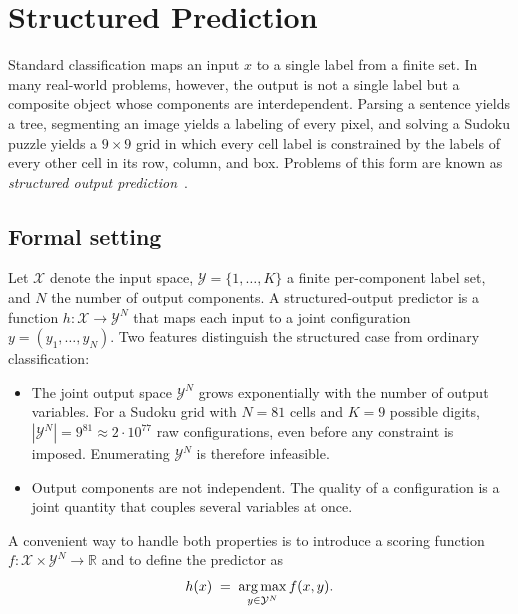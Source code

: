 \bigskip

\section{Structured Prediction}
\label{sec:structured-prediction}

Standard classification maps an input $x$ to a single label from a
finite set. In many real-world problems, however, the output is not a
single label but a composite object whose components are interdependent.
Parsing a sentence yields a tree, segmenting an image yields a labeling
of every pixel, and solving a Sudoku puzzle yields a $9 \times 9$ grid
in which every cell label is constrained by the labels of every other
cell in its row, column, and box. Problems of this form are known as
\emph{structured output prediction}~\cite{Bakir2007}.

\subsection{Formal setting}

Let $\mathcal{X}$ denote the input space, $\mathcal{Y} = \{1, \ldots,
K\}$ a finite per-component label set, and $N$ the number of output
components. A structured-output predictor is a function
$h\colon \mathcal{X} \to \mathcal{Y}^{N}$ that maps each input to a
joint configuration $y = (y_1, \ldots, y_N)$. Two features
distinguish the structured case from ordinary classification:
\begin{itemize}
    \item The joint output space $\mathcal{Y}^{N}$ grows exponentially
    with the number of output variables. For a Sudoku grid with
    $N = 81$ cells and $K = 9$ possible digits,
    $|\mathcal{Y}^{N}| = 9^{81} \approx 2 \cdot 10^{77}$ raw
    configurations, even before any constraint is imposed. Enumerating
    $\mathcal{Y}^{N}$ is therefore infeasible.
    \item Output components are not independent. The quality of a
    configuration is a joint quantity that couples several variables at
    once.
\end{itemize}

A convenient way to handle both properties is to introduce a scoring
function $f\colon \mathcal{X} \times \mathcal{Y}^{N} \to \mathbb{R}$
and to define the predictor as
\begin{equation}
    h(x) \;=\; \operatorname*{arg\,max}_{y \in \mathcal{Y}^{N}} f(x, y).
    \label{eq:map-prediction}
\end{equation}

